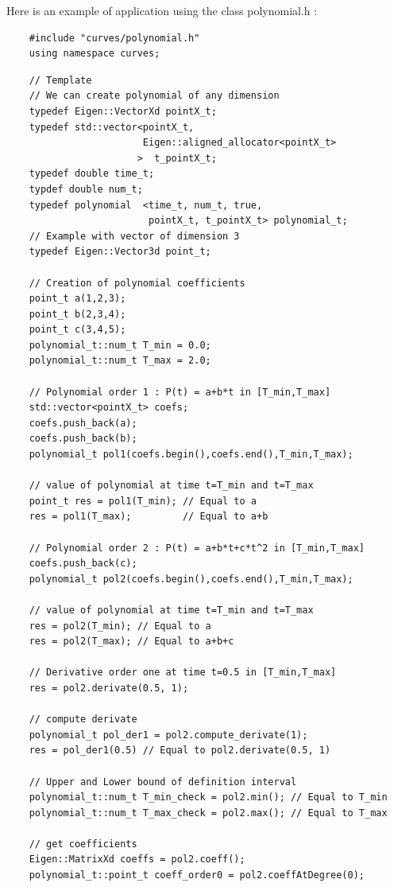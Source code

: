 \documentclass{article}
\begin{document}
    Here is an example of application using the class polynomial.h :
    \begin{lstlisting}
    #include "curves/polynomial.h"
    using namespace curves;
    \end{lstlisting}
    \begin{lstlisting}
    // Template
    // We can create polynomial of any dimension
    typedef Eigen::VectorXd pointX_t;
    typedef std::vector<pointX_t,
                        Eigen::aligned_allocator<pointX_t> 
                       >  t_pointX_t;
    typedef double time_t;
    typdef double num_t;
    typedef polynomial  <time_t, num_t, true, 
                         pointX_t, t_pointX_t> polynomial_t;
    // Example with vector of dimension 3
    typedef Eigen::Vector3d point_t;
    
    // Creation of polynomial coefficients
    point_t a(1,2,3);
    point_t b(2,3,4);
    point_t c(3,4,5);
    polynomial_t::num_t T_min = 0.0;
    polynomial_t::num_t T_max = 2.0;
    
    // Polynomial order 1 : P(t) = a+b*t in [T_min,T_max]
    std::vector<pointX_t> coefs;
    coefs.push_back(a);
    coefs.push_back(b);
    polynomial_t pol1(coefs.begin(),coefs.end(),T_min,T_max);
    
    // value of polynomial at time t=T_min and t=T_max
    point_t res = pol1(T_min); // Equal to a
    res = pol1(T_max);         // Equal to a+b
    
    // Polynomial order 2 : P(t) = a+b*t+c*t^2 in [T_min,T_max]
    coefs.push_back(c);
    polynomial_t pol2(coefs.begin(),coefs.end(),T_min,T_max);
    
    // value of polynomial at time t=T_min and t=T_max
    res = pol2(T_min); // Equal to a
    res = pol2(T_max); // Equal to a+b+c
    
    // Derivative order one at time t=0.5 in [T_min,T_max]
    res = pol2.derivate(0.5, 1);
    
    // compute derivate
    polynomial_t pol_der1 = pol2.compute_derivate(1);
    res = pol_der1(0.5) // Equal to pol2.derivate(0.5, 1)
    
    // Upper and Lower bound of definition interval
    polynomial_t::num_t T_min_check = pol2.min(); // Equal to T_min
    polynomial_t::num_t T_max_check = pol2.max(); // Equal to T_max
    
    // get coefficients
    Eigen::MatrixXd coeffs = pol2.coeff();
    polynomial_t::point_t coeff_order0 = pol2.coeffAtDegree(0);
    

\end{lstlisting}
\end{document}
